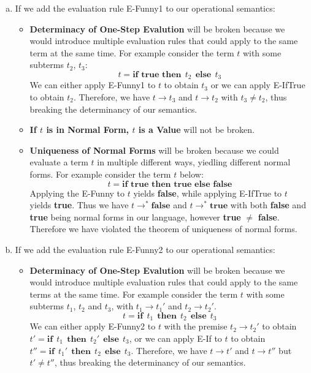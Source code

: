 \documentclass[12pt, fleqn]{article}
\begin{document}
\begin{enumerate}[(a)]
    
    \item If we add the evaluation rule E-Funny1 to our operational semantics:

    \begin{itemize}
        \item \textbf{Determinacy of One-Step Evalution} will be broken because we would introduce multiple evaluation rules that could apply to the same term at the same time. For example consider the term $t$ with some subterms $t_2$, $t_3$:
        $$t = \textbf{if true then}\:\:t_2\:\:\textbf{else}\:\:t_3$$ 
        We can either apply E-Funny1 to $t$ to obtain $t_3$ or we can apply E-IfTrue to obtain $t_2$. Therefore, we have $t \rightarrow t_3$ and $t \rightarrow t_2$ with $t_3 \neq t_2$, thus breaking the determinancy of our semantics.


        \item \textbf{If $t$ is in Normal Form, $t$ is a Value} will not be broken.
        
        \item \textbf{Uniqueness of Normal Forms} will be broken because we could evaluate a term $t$ in multiple different ways, yiedling different normal forms. For example consider the term $t$ below:
        $$t = \textbf{if true then true else false}$$
        Applying the E-Funny to $t$ yields \textbf{false}, while applying E-IfTrue to $t$ yields \textbf{true}. Thus we have $t \rightarrow^* \textbf{false}$ and $t \rightarrow^* \textbf{true}$ with both \textbf{false} and \textbf{true} being normal forms in our language, however \textbf{true} $\neq$ \textbf{false}. Therefore we have violated the theorem of uniqueness of normal forms.

    \end{itemize}
    \item If we add the evaluation rule E-Funny2 to our operational semantics:

    \begin{itemize}
        \item \textbf{Determinacy of One-Step Evalution} will be broken because we would introduce multiple evaluation rules that could apply to the same terms at the same time. For example consider the term $t$ with some subterms $t_1$, $t_2$ and $t_3$, with $t_1 \rightarrow t_1'$ and $t_2 \rightarrow t_2'$.
        $$t = \textbf{if}\:\:t_1\:\:\textbf{then}\:\:t_2\:\:\textbf{else}\:\:t_3$$ 
        We can either apply E-Funny2 to $t$ with the premise $t_2 \rightarrow t_2'$ to obtain\\$t' = \textbf{if}\:\:t_1\:\:\textbf{then}\:\:t_2'\:\:\textbf{else}\:\:t_3$, or we can apply E-If to $t$ to obtain\\ $t'' = \textbf{if}\:\:t_1'\:\:\textbf{then}\:\:t_2\:\:\textbf{else}\:\:t_3$. Therefore, we have $t \rightarrow t'$ and $t \rightarrow t''$ but $t' \neq t''$, thus breaking the determinancy of our semantics.


\end{itemize}
\end{enumerate}
\end{document}
